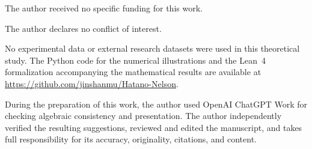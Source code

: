 
\bigskip
{}
The author received no specific funding for this work.

\medskip
{}
The author declares no conflict of interest.

\medskip
{}
No experimental data or external research datasets were used in this
theoretical study.  The Python code for the numerical illustrations and the
Lean~4 formalization accompanying the mathematical results are available at
\url{https://github.com/jinshanmu/Hatano-Nelson}.

\medskip
{}
During the preparation of this work, the author used OpenAI ChatGPT Work for
checking algebraic consistency and presentation.  The author independently
verified the resulting suggestions, reviewed and edited the manuscript, and
takes full responsibility for its accuracy, originality, citations, and
content.
